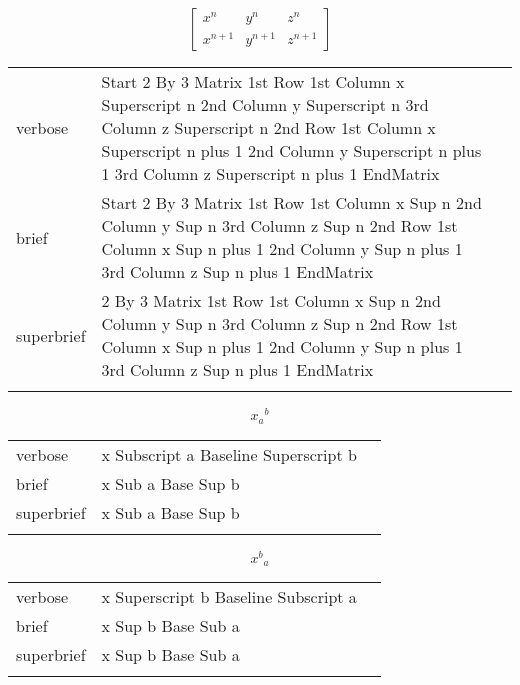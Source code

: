 \R
\E \[
\begin{bmatrix}
  x^n & y^n & z^n\\
  x^{n+1} & y^{n+1} & z^{n+1}
\end{bmatrix}
\]

\begin{longtable}[c]{@{}lll@{}}
\toprule\addlinespace
verbose & Start 2 By 3 Matrix 1st Row 1st Column x Superscript n 2nd
Column y Superscript n 3rd Column z Superscript n 2nd Row 1st Column x
Superscript n plus 1 2nd Column y Superscript n plus 1 3rd Column z
Superscript n plus 1 EndMatrix &

\\\addlinespace
brief & Start 2 By 3 Matrix 1st Row 1st Column x Sup n 2nd Column y Sup
n 3rd Column z Sup n 2nd Row 1st Column x Sup n plus 1 2nd Column y Sup
n plus 1 3rd Column z Sup n plus 1 EndMatrix &

\\\addlinespace
superbrief & 2 By 3 Matrix 1st Row 1st Column x Sup n 2nd Column y Sup n
3rd Column z Sup n 2nd Row 1st Column x Sup n plus 1 2nd Column y Sup n
plus 1 3rd Column z Sup n plus 1 EndMatrix &

\\\addlinespace
\bottomrule
\end{longtable}


\R
\E \[{x_a}^b\]
\begin{longtable}[c]{@{}lll@{}}
\toprule\addlinespace
verbose & x Subscript a Baseline Superscript b &

\\\addlinespace
brief & x Sub a Base Sup b &

\\\addlinespace
superbrief & x Sub a Base Sup b &

\\\addlinespace
\bottomrule
\end{longtable}


\E \[{x^b}_a\]
\begin{longtable}[c]{@{}lll@{}}
\toprule\addlinespace
verbose & x Superscript b Baseline Subscript a &

\\\addlinespace
brief & x Sup b Base Sub a &

\\\addlinespace
superbrief & x Sup b Base Sub a &

\\\addlinespace
\bottomrule
\end{longtable}


